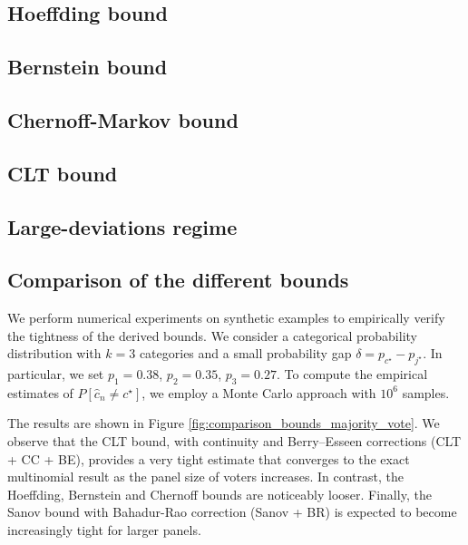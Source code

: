 \documentclass{article} %
\begin{document}
\subsection{Hoeffding bound}\label{app:hoeffding_bound}


\subsection{Bernstein bound}\label{app:bernstein_bound}


\subsection{Chernoff-Markov bound}\label{app:chernoff-markov_bound}


\subsection{CLT bound}\label{app:majority-clt}


\subsection{Large-deviations regime}\label{app:sanov_bound}


\subsection{Comparison of the different bounds}\label{app:subsec_comparison_bounds}
We perform numerical experiments on synthetic examples to empirically verify the tightness of the derived bounds. 
We consider a categorical probability distribution with  $k=3$ categories and a small probability gap $\delta = p_{{c}^\star}-p_{j^\star}$. In particular, we set $p_1 = 0.38$, $p_2 = 0.35$,  $p_3 = 0.27$.   
To compute the empirical estimates of $P[\widehat{c}_n \neq c^\star]$, we employ a Monte Carlo approach with $10^6$ samples.  

The results are shown in Figure \ref{fig:comparison_bounds_majority_vote}. We observe that the CLT bound, with continuity and Berry–Esseen corrections (CLT + CC + BE), provides a very tight estimate that converges to the exact multinomial result as the panel size of voters increases.
In contrast, the Hoeffding, Bernstein and Chernoff bounds are noticeably looser. Finally, the Sanov bound with Bahadur-Rao correction (Sanov + BR) is expected to become increasingly tight for larger panels. 
\end{document}
